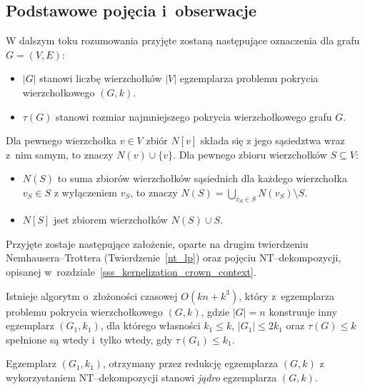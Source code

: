 \subsection{Podstawowe pojęcia i~obserwacje}\label{ss_ckx_preliminaries}
\par{
  W dalszym toku rozumowania przyjęte zostaną następujące oznaczenia dla grafu $G=(V, E)$:
  \begin{itemize}
    \item $|G|$ stanowi liczbę wierzchołków $|V|$ egzemplarza problemu pokrycia wierzchołkowego $(G, k)$.
    \item $\tau(G)$ stanowi rozmiar najmniejszego pokrycia wierzchołkowego grafu $G$.
  \end{itemize}
  Dla pewnego wierzchołka $v \in V$ zbiór $N[v]$ składa się z jego sąsiedztwa wraz z~nim samym, to znaczy $N(v) \cup \{v\}$.
  Dla pewnego zbioru wierzchołków $S \subseteq V$:
  \begin{itemize}
    \item $N(S)$ to suma zbiorów wierzchołków sąsiednich dla każdego wierzchołka $v_S \in S$ z wyłączeniem $v_S$, to znaczy $N(S)=\bigcup_{v_S\in S}N(v_S) \setminus S$.
    \item $N[S]$ jset zbiorem wierzchołków $N(S) \cup S$.
  \end{itemize}

  Przyjęte zostaje następujące założenie, oparte na drugim twierdzeniu Nemhausera--Trottera (Twierdzenie~\ref{nt_lp}) oraz pojęciu NT--dekompozycji, opisanej w~rozdziale~\ref{sss_kernelization_crown_context}.
  \begin{proposition}
    Istnieje algorytm o~złożoności czasowej $O(kn + k^3)$, który z~egzemplarza problemu pokrycia wierzchołkowego $(G, k)$, gdzie $|G|=n$ konstruuje inny egzemplarz $(G_1, k_1)$, dla którego własności $k_1 \leq k$, $|G_1| \leq 2k_1$ oraz $\tau(G) \leq k$ spełnione są wtedy i~tylko wtedy, gdy $\tau(G_1) \leq k_1$.
  \end{proposition}

  \begin{definition}
    Egzemplarz $(G_1, k_1)$, otrzymany przez redukcję egzemplarza $(G, k)$ z wykorzystaniem NT--dekompozycji stanowi \emph{jądro} egzemplarza $(G, k)$.
  \end{definition}
}
